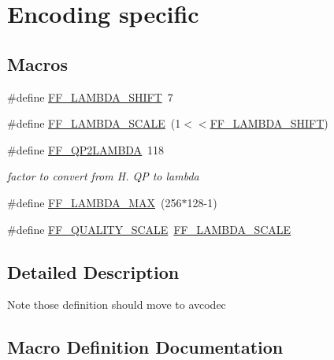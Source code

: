 \hypertarget{group__lavu__enc}{}\section{Encoding specific}
\label{group__lavu__enc}
\subsection*{Macros}
\begin{DoxyCompactItemize}
\item 
\#define \hyperlink{group__lavu__enc_ga979d8e4b4947c924436fcc3b62cafea7}{F\+F\+\_\+\+L\+A\+M\+B\+D\+A\+\_\+\+S\+H\+I\+FT}~7
\item 
\#define \hyperlink{group__lavu__enc_ga44d4d51371d07ef43eb009ef29a0b534}{F\+F\+\_\+\+L\+A\+M\+B\+D\+A\+\_\+\+S\+C\+A\+LE}~(1$<$$<$\hyperlink{group__lavu__enc_ga979d8e4b4947c924436fcc3b62cafea7}{F\+F\+\_\+\+L\+A\+M\+B\+D\+A\+\_\+\+S\+H\+I\+FT})
\item 
\#define \hyperlink{group__lavu__enc_gad6ce86405f7381daad36ccf516b4da98}{F\+F\+\_\+\+Q\+P2\+L\+A\+M\+B\+DA}~118
\begin{DoxyCompactList}\small\item\em factor to convert from H. QP to lambda \end{DoxyCompactList}\item 
\#define \hyperlink{group__lavu__enc_gabc22a7ffbd4a73e81dd69e8c45e6cf8c}{F\+F\+\_\+\+L\+A\+M\+B\+D\+A\+\_\+\+M\+AX}~(256$\ast$128-\/1)
\item 
\#define \hyperlink{group__lavu__enc_gab1026a3e2eb8430ec938fffdc1bb2238}{F\+F\+\_\+\+Q\+U\+A\+L\+I\+T\+Y\+\_\+\+S\+C\+A\+LE}~\hyperlink{group__lavu__enc_ga44d4d51371d07ef43eb009ef29a0b534}{F\+F\+\_\+\+L\+A\+M\+B\+D\+A\+\_\+\+S\+C\+A\+LE}
\end{DoxyCompactItemize}


\subsection{Detailed Description}
\begin{DoxyNote}{Note}
those definition should move to avcodec 
\end{DoxyNote}


\subsection{Macro Definition Documentation}
